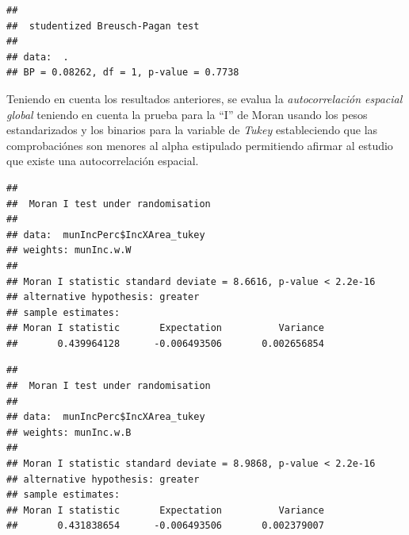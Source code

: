 \documentclass[11pt,]{article}
\newenvironment{Shaded}{\begin{snugshade}}{\end{snugshade}}
\newcommand{\KeywordTok}[1]{\textcolor[rgb]{0.13,0.29,0.53}{\textbf{#1}}}
\newcommand{\DataTypeTok}[1]{\textcolor[rgb]{0.13,0.29,0.53}{#1}}
\newcommand{\StringTok}[1]{\textcolor[rgb]{0.31,0.60,0.02}{#1}}
\newcommand{\OperatorTok}[1]{\textcolor[rgb]{0.81,0.36,0.00}{\textbf{#1}}}
\newcommand{\NormalTok}[1]{#1}
\begin{document}
\begin{verbatim}
## 
##  studentized Breusch-Pagan test
## 
## data:  .
## BP = 0.08262, df = 1, p-value = 0.7738
\end{verbatim}

Teniendo en cuenta los resultados anteriores, se evalua la
\emph{autocorrelación espacial global} teniendo en cuenta la prueba para
la ``I'' de Moran usando los pesos estandarizados y los binarios para la
variable de \emph{Tukey} estableciendo que las comprobaciónes son
menores al alpha estipulado permitiendo afirmar al estudio que existe
una autocorrelación espacial.

\begin{Shaded}
\end{Shaded}

\begin{verbatim}
## 
##  Moran I test under randomisation
## 
## data:  munIncPerc$IncXArea_tukey  
## weights: munInc.w.W    
## 
## Moran I statistic standard deviate = 8.6616, p-value < 2.2e-16
## alternative hypothesis: greater
## sample estimates:
## Moran I statistic       Expectation          Variance 
##       0.439964128      -0.006493506       0.002656854
\end{verbatim}

\begin{Shaded}
\end{Shaded}

\begin{verbatim}
## 
##  Moran I test under randomisation
## 
## data:  munIncPerc$IncXArea_tukey  
## weights: munInc.w.B    
## 
## Moran I statistic standard deviate = 8.9868, p-value < 2.2e-16
## alternative hypothesis: greater
## sample estimates:
## Moran I statistic       Expectation          Variance 
##       0.431838654      -0.006493506       0.002379007
\end{verbatim}
\end{document}
